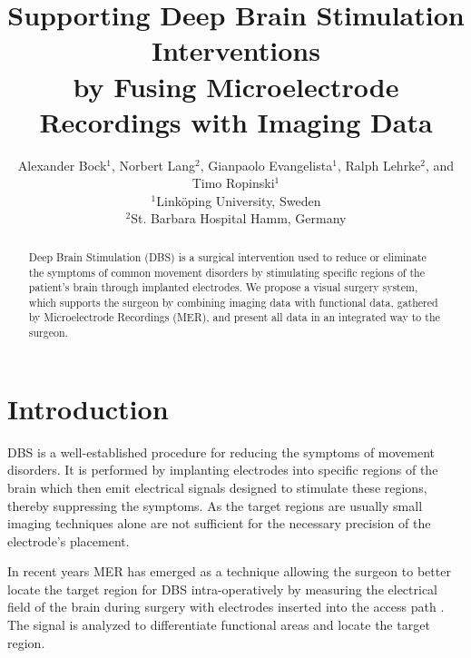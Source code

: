 \documentclass{egpubl}
\title{Supporting Deep Brain Stimulation Interventions \\ by Fusing Microelectrode Recordings with Imaging Data}
\author{Alexander Bock$^1$, Norbert Lang$^2$, Gianpaolo Evangelista$^1$, Ralph Lehrke$^2$, and Timo Ropinski$^1$ \\
$^1$Link\"oping University, Sweden \\
$^2$St. Barbara Hospital Hamm, Germany
}
\begin{document}

\maketitle

\begin{abstract}
Deep Brain Stimulation (DBS) is a surgical intervention used to reduce or eliminate the symptoms of common movement disorders by stimulating specific regions of the patient's brain through implanted electrodes. We propose a visual surgery system, which supports the surgeon by combining imaging data with functional data, gathered by Microelectrode Recordings (MER), and present all data in an integrated way to the surgeon.
\end{abstract}

\section{Introduction}
DBS is a well-established procedure for reducing the symptoms of movement disorders. It is performed by implanting electrodes into specific regions of the brain which then emit electrical signals designed to stimulate these regions, thereby suppressing the symptoms. As the target regions are usually small imaging techniques alone are not sufficient for the necessary precision of the electrode's placement.

In recent years MER has emerged as a technique allowing the surgeon to better locate the target region for DBS intra-operatively by measuring the electrical field of the brain during surgery with electrodes inserted into the access path \cite{Lenz1988}. The signal is analyzed to differentiate functional areas and locate the target region.
\end{document}
